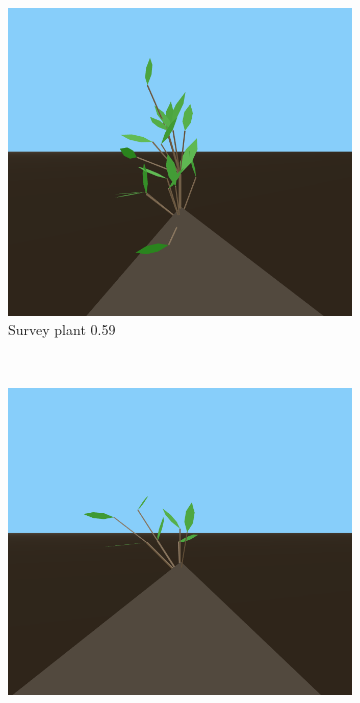 \begin{figure}
    \centering
    \begin{subfigure}{0.48\textwidth}
        \includegraphics[width=\textwidth]{figures/plant-59}
        \caption{Survey plant 0.59}
    \end{subfigure}
    ~
    \begin{subfigure}{0.48\textwidth}
        \includegraphics[width=\textwidth]{figures/plant-53}

\end{subfigure}
\end{figure}
